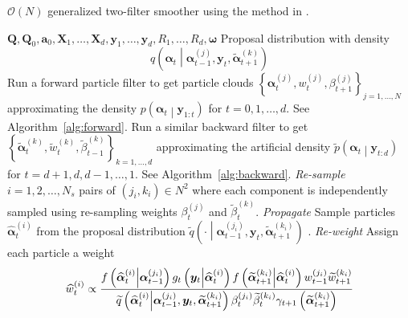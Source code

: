 \documentclass[notitlepage]{article}
\newcommand\StateXX{\Statex\hspace{\algorithmicindent}\hspace{\algorithmicindent}}
\renewcommand{\vec}[1]{\bm{#1}}
\newcommand{\mat}[1]{\mathbf{#1}}
\newcommand{\Lbrace}[1]{\left\{ #1\right\}}
\newcommand{\Lparen}[1]{\left( #1\right)}
\newcommand{\Cond}[2]{ #1 \middle\vert  #2}
\newcommand{\optor}[2]{#1\Lparen{#2}}
\newcommand{\optorC}[3]{\optor{#1}{\Cond{#2}{#3}}}
\newcommand{\pdensC}[2]{\optorC{p}{#1}{#2}}
\newcommand{\pdenstC}[2]{\optorC{\widetilde p}{#1}{#2}}
\newcommand{\gFunc}[3]{\optorC{g_{#3}}{#1}{#2}}
\newcommand{\fFunc}[2]{\optorC{f}{#1}{#2}}
\newcommand{\IDC}[2]{\optorC{q}{#1}{#2}}
\newcommand{\IDAproxC}[2]{\optorC{\widetilde{q}}{#1}{#2}}
\newcommand{\partic}[3]{#1_{#2}^{\Lparen{#3}}}
\newcommand{\particB}[3]{\widetilde{#1}_{#2}^{\Lparen{#3}}}
\newcommand{\particS}[3]{\widehat{#1}_{#2}^{\Lparen{#3}}}
\newcommand{\bigO}[1]{\mathcal{O}\Lparen{#1}}
\newcommand{\nPart}{N}
\newcommand{\nPeriods}{d}
\begin{document}
\newpage

\begin{algorithm}[H]
\caption{$\bigO{\nPart}$ generalized two-filter smoother using the method in \cite{fearnhead10}.}\label{alg:ONsmoother}
\begin{algorithmic}[1]\raggedright
\INPUT
\Statex $\mat{Q},\mat{Q}_0,\vec{a}_0,\mat{X}_1,\dots,\mat{X}_d,\vec{y}_1,\dots,\vec{y}_d,R_1,\dots,R_d,\vec{\omega}$
%
\Statex Proposal distribution with density
\Statex \begin{equation}
	\IDC{\vec{\alpha}_t}{\partic{\vec{\alpha}}{t-1}{j},\vec{y}_t, \particB{\vec{\alpha}}{t+1}{k}}
\end{equation}
%
\State Run a forward particle filter to get particle clouds %
	$\Lbrace{\partic{\vec{\alpha}}{t}{j}, \partic{w}{t}{j}, \partic{\beta}{t + 1}{j}}_{j=1,\dots,\nPart}$ %
	approximating the density $\pdensC{\vec{\alpha}_t}{\vec{y}_{1:t}}$ for $t = 0, 1, \dots, \nPeriods$. See Algorithm~\ref{alg:forward}.
\EndProcedure
%
\State Run a similar backward filter to get %
	$\Lbrace{\particB{\vec{\alpha}}{t}{k}, \particB{w}{t}{k}, \particB{\beta}{t - 1}{k}}_{k=1,\dots,\nPeriods}$  %
	approximating the artificial density $\pdenstC{\vec{\alpha}_t}{\vec{y}_{t:\nPeriods}}$ for $t = \nPeriods + 1, \nPeriods, \nPeriods - 1, \dots, 1$. See Algorithm~\ref{alg:backward}.
\EndProcedure
%
\For{$t=1,\dots, \nPeriods$}
\StateXX \emph{Re-sample}
\State $i=1,2,\dots,\nPart_s$ pairs of $\Lparen{j_i, k_i}\in\nPart^2$ where each component 
is independently sampled using re-sampling weights $\partic{\beta}{t}{j}$ and $\particB{\beta}{t}{k}$.
%
\StateXX \emph{Propagate}
\State Sample particles $\particS{\vec{\alpha}}{t}{i}$ from the proposal distribution %
	$\IDAproxC{\cdot}{\partic{\vec{\alpha}}{t-1}{j_i},\vec{y}_t, \particB{\vec{\alpha}}{t + 1}{k_i}}$%
.%
\StateXX \emph{Re-weight}
\State Assign each particle a weight
\StateXX \begin{equation}\label{eqn:combineWeight}
 \particS{w}{t}{i} \propto \frac{
 	\fFunc{\particS{\vec{\alpha}}{t}{i}}{\partic{\vec{\alpha}}{t - 1}{j_i}}
 	\gFunc{\vec{y}_t}{\particS{\vec{\alpha}}{t}{i}}{t}
 	\fFunc{\particB{\vec{\alpha}}{t + 1}{k_i}}{\particS{\vec{\alpha}}{t}{i}}
 	\partic{w}{t - 1}{j_i}\particB{w}{t + 1}{k_i}
 	}{ %
 	\IDAproxC{\particS{\vec{\alpha}}{t}{i}}{\partic{\vec{\alpha}}{t-1}{j_i},\vec{y}_t, \particB{\vec{\alpha}}{t+1}{k_i}}
 	\partic{\beta}{t}{j_i}\particB{\beta}{t}{k_i}\gamma_{t +1}\Lparen{\particB{\vec{\alpha}}{t+1}{k_i}}
 	} %
\end{equation}
\EndFor
\EndProcedure
\end{algorithmic}
\end{algorithm}
\end{document}
